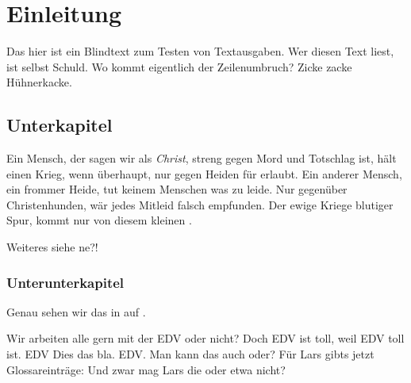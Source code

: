 \section{Einleitung}

Das hier ist ein Blindtext zum Testen von Textausgaben. Wer diesen Text liest, ist selbst Schuld. Wo
kommt eigentlich der Zeilenumbruch? Zicke zacke Hühnerkacke.

\subsection{Unterkapitel}

Ein Mensch, der sagen wir als \emph{Christ}, streng gegen Mord und Totschlag ist, hält einen Krieg,
wenn überhaupt, nur gegen Heiden für erlaubt. Ein anderer Mensch, ein frommer Heide, tut keinem Menschen
was zu leide. Nur gegenüber Christenhunden, wär jedes Mitleid falsch empfunden. Der ewige Kriege
blutiger Spur, kommt nur von diesem kleinen . 

Weiteres siehe  ne?!

\subsubsection{Unterunterkapitel}


Genau sehen wir das in  auf .


Wir arbeiten alle gern mit der \acs{EDV} oder nicht? Doch \acl{EDV} ist toll, weil \ac{EDV} toll
ist. \ac{EDV} Dies das bla. \acf{EDV}. Man kann das auch oder? Für Lars gibts jetzt Glossareinträge:
Und zwar mag Lars die  oder etwa nicht?

